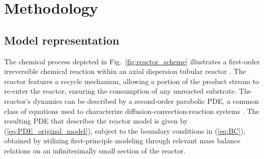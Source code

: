 \section{Methodology}

\subsection{Model representation}

The chemical process depicted in Fig.~\ref{fig:reactor_scheme} illustrates a first-order irreversible chemical reaction within an axial dispersion tubular reactor \cite{levenspiel1998chemical}. The reactor features a recycle mechanism, allowing a portion of the product stream to re-enter the reactor, ensuring the consumption of any unreacted substrate. The reactor's dynamics can be described by a second-order parabolic PDE, a common class of equations used to characterize diffusion-convection-reaction systems \cite{jensen1982bifurcation}. The resulting PDE that describes the reactor model is given by (\ref{eq:PDE_original_model}), subject to the boundary conditions in (\ref{eq:BC}), obtained by utilizing first-principle modeling through relevant mass balance relations on an infinitesimally small section of the reactor.

